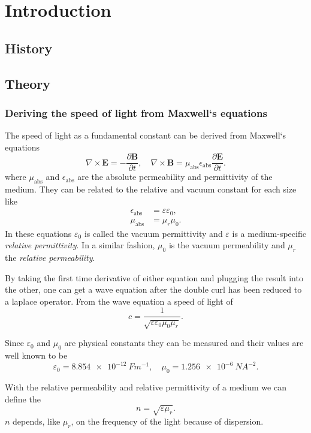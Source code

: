 \section{Introduction}
\label{sec:introduction}

\subsection{History}
\label{sec:history}

\subsection{Theory}
\label{sec:theory}

\subsubsection{Deriving the speed of light from Maxwell`s equations}
The speed of light as a fundamental constant can be derived from Maxwell`s equations
\cite{Griffiths:1492149}
\begin{equation}
  \nabla \times \mathbf{E} = - \frac{\partial \mathbf{B}}{\partial t}, \quad
  \nabla \times \mathbf{B} = \mu_\text{abs} \epsilon_\text{abs} 
                              \frac{\partial \mathbf E}{\partial t} .
\end{equation}
where $\mu_\text{abs}$ and $\epsilon_\text{abs}$ are the absolute permeability and permittivity of
the medium. They can be related to the relative and vacuum constant for each size like
\begin{align}
  \epsilon_\text{abs} &= \varepsilon \varepsilon_0, \\
  \mu_\text{abs} &= \mu_r \mu_0.
\end{align}
In these equations $\varepsilon_0$ is called the vacuum permittivity and $\varepsilon$ is a
medium-specific \textit{relative permittivity}. In a similar fashion, $\mu_0$ is the vacuum
permeability and $\mu_r$ the \textit{relative permeability}.

By taking the first time derivative of either equation and plugging the result into the other, one
can get a wave equation after the double curl has been reduced to a laplace operator. From the wave
equation a speed of light of
\begin{equation}
  c = \frac{1}{\sqrt{\varepsilon \varepsilon_0 \mu_0 \mu_r}}.
\end{equation}

Since $\varepsilon_0$ and $\mu_0$ are physical constants they can be measured and their values are
well known to be \cite{muzero,epsilonzero}
\begin{equation}
  \varepsilon_0 = \SI{8.854e-12}{Fm^{-1}}, \quad
  \mu_0 = \SI{1.256e-6}{NA^{-2}}.
\end{equation}

With the relative permeability and relative permittivity of a medium we can define the
\[
  n = \sqrt{\varepsilon \mu_r}.
\]
$n$ depends, like $\mu_r$, on the frequency of the light because of dispersion.

